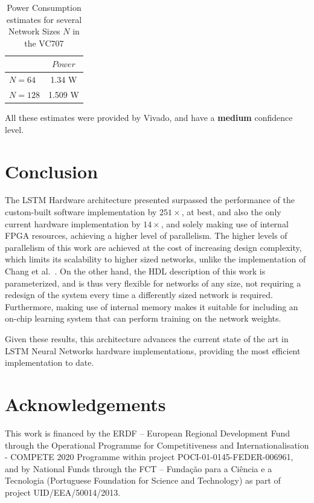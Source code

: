 \documentclass{IEEEtran}
\begin{document}
\begin{table}
	\caption{Power Consumption estimates for several Network Sizes $N$ in the VC707}
	\label{tab:power-virtx7}
    \centering
  \begin{tabular}{ | l | c | }
    \hline
     & $Power$  \\
    \hline
    $N=64$ & 1.34 W \\
    \hline
    $N=128$ & 1.509 W\\
\hline
  \end{tabular}

\end{table}

All these estimates were provided by Vivado, and have a \textbf{medium} confidence level.

\section{Conclusion}\label{sec:concl}
The LSTM Hardware architecture presented surpassed the performance of the custom-built software implementation by $251\times$, at best,
and also the only current hardware implementation by $14\times$, and solely making use of internal FPGA
resources, achieving a higher level of parallelism. The higher levels of parallelism of this work are achieved at the cost of increasing
design complexity, which limits its scalability to higher sized networks, unlike the implementation of Chang et al.~\cite{Chang15}.
On the other hand, the HDL description of this work is parameterized, and is thus very flexible for networks of any size, not requiring
a redesign of the system every time a differently sized network is required. Furthermore, making use of internal memory makes it suitable
for including an on-chip learning system that can perform training on the network weights.

Given these results, this architecture advances the current state of the art in LSTM Neural Networks
hardware implementations, providing the most efficient implementation to date.

\section*{Acknowledgements}
This work is financed by the ERDF – European Regional Development Fund through the Operational Programme for Competitiveness and Internationalisation - COMPETE 2020 Programme within project \guillemotleft POCI-01-0145-FEDER-006961\guillemotright, and by National Funds through the FCT – Fundação para a Ciência e a Tecnologia (Portuguese Foundation for Science and Technology) as part of project \guillemotleft UID/EEA/50014/2013\guillemotright.




\end{document}
